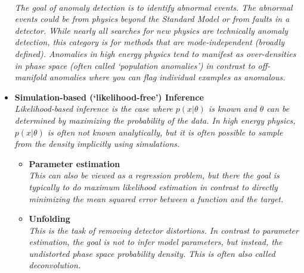 \documentclass[12pt,letterpaper]{article}
\begin{document}
\begin{itemize}
\\\textit{The goal of anomaly detection is to identify abnormal events.  The abnormal events could be from physics beyond the Standard Model or from faults in a detector.  While nearly all searches for new physics are technically anomaly detection, this category is for methods that are mode-independent (broadly defined).  Anomalies in high energy physics tend to manifest as over-densities in phase space (often called `population anomalies') in contrast to off-manifold anomalies where you can flag individual examples as anomalous. }
\item \textbf{Simulation-based (`likelihood-free') Inference}
\\\textit{Likelihood-based inference is the case where $p(x|\theta)$ is known and $\theta$ can be determined by maximizing the probability of the data.  In high energy physics, $p(x|\theta)$ is often not known analytically, but it is often possible to sample from the density implicitly using simulations.}
	\begin{itemize}
		\item \textbf{Parameter estimation}~\cite{Andreassen:2019nnm,Stoye:2018ovl,Hollingsworth:2020kjg,Brehmer:2018kdj,Brehmer:2018eca,Brehmer:2019xox,Brehmer:2018hga,Cranmer:2015bka,Andreassen:2020gtw,Coogan:2020yux,Flesher:2020kuy,Bieringer:2020tnw,Nachman:2021yvi,Chatterjee:2021nms,NEURIPS2020_a878dbeb,Mishra-Sharma:2021oxe,Barman:2021yfh,Bahl:2021dnc,Arganda:2022qzy,Kong:2022rnd,Arganda:2022zbs,Butter:2022vkj,Neubauer:2022gbu,Rizvi:2023mws,Heinrich:2023bmt,Breitenmoser:2023tmi,Erdogan:2023uws,Morandini:2023pwj,Barrue:2023ysk,Espejo:2023wzf,Heimel:2023mvw}
		\\\textit{This can also be viewed as a regression problem, but there the goal is typically to do maximum likelihood estimation in contrast to directly minimizing the mean squared error between a function and the target.}
		\item \textbf{Unfolding}~\cite{Mieskolainen:2018fhf,Andreassen:2019cjw,Datta:2018mwd,Bellagente:2019uyp,Gagunashvili:2010zw,Glazov:2017vni,Martschei:2012pr,Lindemann:1995ut,Zech2003BinningFreeUB,1800956,Vandegar:2020yvw,Howard:2021pos,Baron:2021vvl,Andreassen:2021zzk,Komiske:2021vym,H1:2021wkz,Arratia:2021otl,Wong:2021zvv,Arratia:2022wny,Backes:2022vmn,Chan:2023tbf,Shmakov:2023kjj}
		\\\textit{This is the task of removing detector distortions.  In contrast to parameter estimation, the goal is not to infer model parameters, but instead, the undistorted phase space probability density.  This is often also called deconvolution.}

\end{itemize}
\end{itemize}
\end{document}
